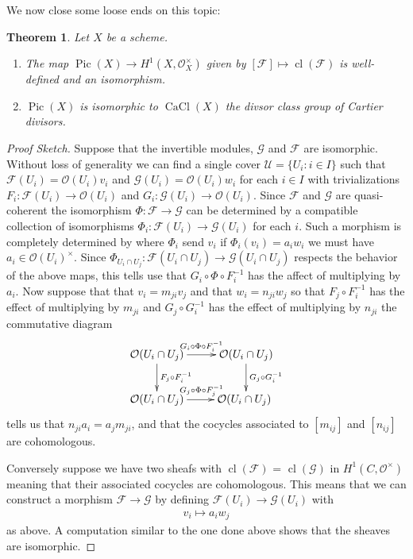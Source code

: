 \documentclass[12pt]{article}
\numberwithin{equation}{section}
\newtheorem{theorem}{Theorem}[subsection]
\theoremstyle{definition}
\theoremstyle{remark}
\newcommand{\Ocal}{\mathcal{O}}
\newcommand{\CaCl}{\operatorname{CaCl}}
\newcommand{\Pic}{\operatorname{Pic}}
\newcommand{\Fcal}{\mathcal{F}}
\newcommand{\cl}{\operatorname{cl}}
\begin{document}
We now close some loose ends on this topic:
\begin{theorem}
	Let $X$ be a scheme. 
	\begin{enumerate}
		\item 	The map $\Pic(X) \to H^1(X,\Ocal_X^{\times})$ given by $[\Fcal]\mapsto \cl(\Fcal)$ is well-defined and an isomorphism.
		\item $\Pic(X)$ is isomorphic to $\CaCl(X)$ the divsor class group of Cartier divisors.
	\end{enumerate}
\end{theorem}
\begin{proof}[Proof Sketch]
	Suppose that the invertible modules,  $\mathcal G$ and $\mathcal F$ are isomorphic. Without loss of generality we can find a single cover $\mathcal U = \lbrace U_i : i\in I \rbrace$ such that $\mathcal F(U_i) = \mathcal O(U_i) v_i$ and $\mathcal G(U_i) = \mathcal O(U_i) w_i$ for each $i\in I$ with trivializations $F_i:\mathcal F(U_i) \to \mathcal O(U_i)$ and $G_i:\mathcal G(U_i)\to \mathcal O(U_i)$. 
	Since $\mathcal F$ and $\mathcal G$ are quasi-coherent the isomorphism $\Phi:\mathcal F\to \mathcal G$ can be determined by a compatible collection of isomorphisms $\Phi_i: \mathcal F(U_i) \to \mathcal G(U_i)$ for each $i$. 
	Such a morphism is completely determined by where $\Phi_i$ send $v_i$ if  $\Phi_i(v_i) = a_iw_i$ we must have $a_i\in \mathcal O(U_i)^{\times}$.
	Since $\Phi_{U_i\cap U_j}:\mathcal F(U_i\cap U_j)\to \mathcal G(U_i\cap U_j)$ respects the behavior of the above maps, 
	this tells use that $G_i \circ \Phi \circ F_i^{-1}$ has the affect of multiplying by $a_i$. Now suppose that that $v_i=m_{ji}v_j$ and that $w_i = n_{ji}  w_j$  so that $F_{j}\circ F_i^{-1}$ has the effect of multiplying by $m_{ji}$ and $G_j\circ G_i^{-1}$ has the effect of multiplying by $n_{ji}$ the commutative diagram
	$$\xymatrix{
		\mathcal O(U_i\cap U_j) \ar[d]^{F_j\circ F_i^{-1}} \ar[r]^{G_i\circ \Phi \circ F_i^{-1} }& \mathcal O (U_i\cap U_j)\ar[d]^{G_j\circ G_i^{-1}}\\
		\mathcal O(U_i\cap U_j) \ar[r]^{G_j\circ \Phi \circ F_j^{-1}} & \mathcal O(U_i\cap U_j)\
	}$$
	tells us that $n_{ji}a_i = a_j m_{ji}$, and that the cocycles associated to $[m_{ij}]$ and $[n_{ij}]$ are cohomologous.
	
	Conversely suppose we have two sheafs with $\cl(\mathcal F)$ = $\cl(\mathcal G)$ in $H^1(C,\mathcal O^{\times})$ meaning that their associated cocycles are cohomologous. This means that we can construct a morphism $\mathcal F\to \mathcal G$ by defining $\mathcal F(U_i)\to \mathcal G(U_i)$ with 
	\begin{eqnarray*}
		v_i \mapsto a_i w_j 
	\end{eqnarray*}
	as above. A computation similar to the one done above shows that the sheaves are isomorphic. 
	

\end{proof}
\end{document}
